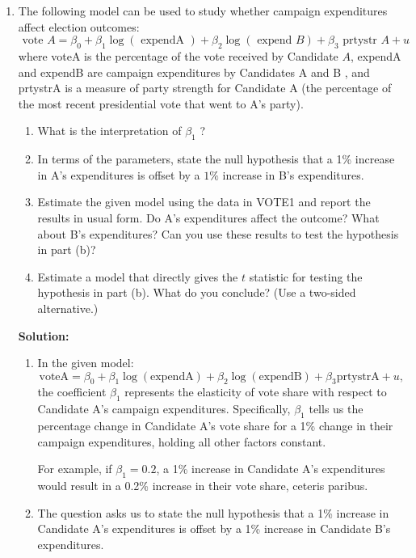 \documentclass[12pt]{article}
\begin{document}
\begin{enumerate}
    \item The following model can be used to study whether campaign expenditures affect election outcomes:
$$
\text { vote } A=\beta_0+\beta_1 \log (\text { expendA })+\beta_2 \log (\text { expend } B)+\beta_3 \text { prtystr } A+u
$$
where voteA is the percentage of the vote received by Candidate $A$, expendA and expendB are campaign expenditures by Candidates A and B , and prtystrA is a measure of party strength for Candidate A (the percentage of the most recent presidential vote that went to A's party).
\begin{enumerate}
    \item What is the interpretation of $\beta_1$ ?
\item In terms of the parameters, state the null hypothesis that a 1\% increase in A's expenditures is offset by a $1 \%$ increase in B's expenditures.
\item Estimate the given model using the data in VOTE1 and report the results in usual form. Do A's expenditures affect the outcome? What about B's expenditures? Can you use these results to test the hypothesis in part (b)?
\item Estimate a model that directly gives the $t$ statistic for testing the hypothesis in part (b). What do you conclude? (Use a two-sided alternative.)
\end{enumerate}


{\color{blue}
\noindent \textbf{Solution:}

\begin{enumerate}
    \item In the given model:
\[
\text{voteA} = \beta_0 + \beta_1 \log(\text{expendA}) + \beta_2 \log(\text{expendB}) + \beta_3 \text{prtystrA} + u,
\]
the coefficient $\beta_1$ represents the elasticity of vote share with respect to Candidate A's campaign expenditures. Specifically, $\beta_1$ tells us the percentage change in Candidate A's vote share for a 1\% change in their campaign expenditures, holding all other factors constant.

For example, if $\beta_1 = 0.2$, a 1\% increase in Candidate A's expenditures would result in a 0.2\% increase in their vote share, ceteris paribus.

\item The question asks us to state the null hypothesis that a 1\% increase in Candidate A's expenditures is offset by a 1\% increase in Candidate B's expenditures.


\end{enumerate}}
\end{enumerate}
\end{document}
